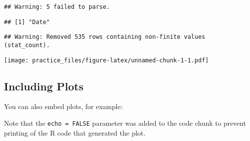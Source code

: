 \documentclass[]{article}
\newenvironment{Shaded}{\begin{snugshade}}{\end{snugshade}}
\newcommand{\KeywordTok}[1]{\textcolor[rgb]{0.13,0.29,0.53}{\textbf{{#1}}}}
\newcommand{\DataTypeTok}[1]{\textcolor[rgb]{0.13,0.29,0.53}{{#1}}}
\newcommand{\StringTok}[1]{\textcolor[rgb]{0.31,0.60,0.02}{{#1}}}
\newcommand{\NormalTok}[1]{{#1}}
\begin{document}
\begin{verbatim}
## Warning: 5 failed to parse.
\end{verbatim}

\begin{Shaded}
\end{Shaded}

\begin{verbatim}
## [1] "Date"
\end{verbatim}

\begin{Shaded}
\end{Shaded}

\begin{verbatim}
## Warning: Removed 535 rows containing non-finite values (stat_count).
\end{verbatim}

\texttt{[image: practice\_files/figure-latex/unnamed-chunk-1-1.pdf]}

\subsection{Including Plots}\label{including-plots}

You can also embed plots, for example:

Note that the \texttt{echo\ =\ FALSE} parameter was added to the code
chunk to prevent printing of the R code that generated the plot.
\end{document}
